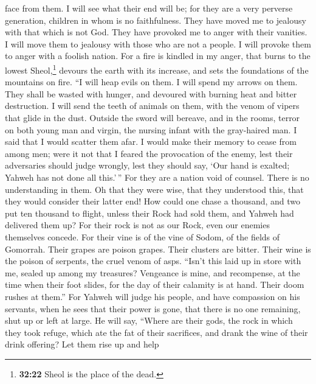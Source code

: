 face from them. I will see what their end will be; for they are a very
perverse generation, children in whom is no faithfulness.
 They have moved me to jealousy with that which is not
God. They have provoked me to anger with their vanities. I will move
them to jealousy with those who are not a people. I will provoke them to
anger with a foolish nation.  For a fire is kindled in my
anger, that burns to the lowest Sheol,\footnote{\textbf{32:22} Sheol is
  the place of the dead.} devours the earth with its increase, and sets
the foundations of the mountains on fire.  ``I will heap
evils on them. I will spend my arrows on them.  They
shall be wasted with hunger, and devoured with burning heat and bitter
destruction. I will send the teeth of animals on them, with the venom of
vipers that glide in the dust.  Outside the sword will
bereave, and in the rooms, terror on both young man and virgin, the
nursing infant with the gray-haired man.  I said that I
would scatter them afar. I would make their memory to cease from among
men;  were it not that I feared the provocation of the
enemy, lest their adversaries should judge wrongly, lest they should
say, `Our hand is exalted; Yahweh has not done all this.'\,''
 For they are a nation void of counsel. There is no
understanding in them.  Oh that they were wise, that they
understood this, that they would consider their latter end!
 How could one chase a thousand, and two put ten thousand
to flight, unless their Rock had sold them, and Yahweh had delivered
them up?  For their rock is not as our Rock, even our
enemies themselves concede.  For their vine is of the
vine of Sodom, of the fields of Gomorrah. Their grapes are poison
grapes. Their clusters are bitter.  Their wine is the
poison of serpents, the cruel venom of asps.  ``Isn't
this laid up in store with me, sealed up among my treasures?
 Vengeance is mine, and recompense, at the time when
their foot slides, for the day of their calamity is at hand. Their doom
rushes at them.''  For Yahweh will judge his people, and
have compassion on his servants, when he sees that their power is gone,
that there is no one remaining, shut up or left at large.
 He will say, ``Where are their gods, the rock in which
they took refuge,  which ate the fat of their sacrifices,
and drank the wine of their drink offering? Let them rise up and help
